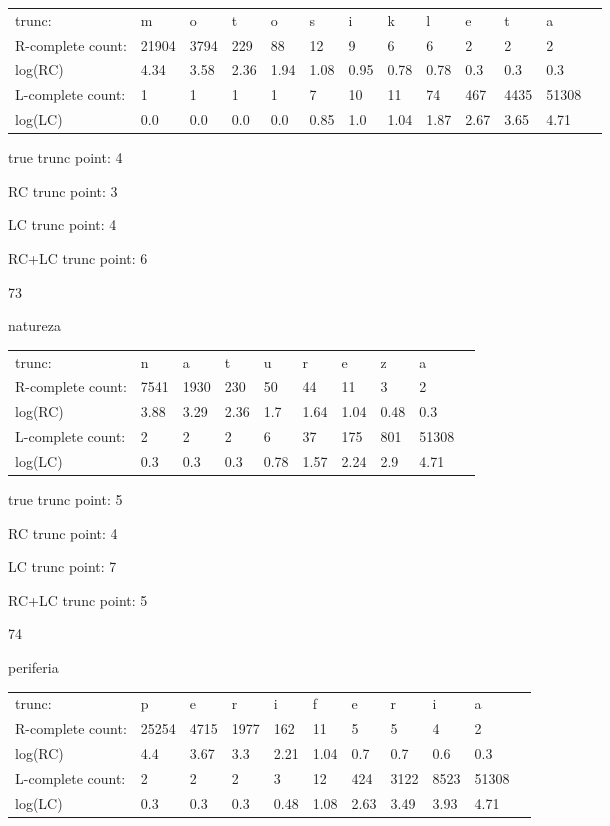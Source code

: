\documentclass{article}
\begin{document}
\begin{tabular}{l|llllllllllll}
trunc: & m & o & t & o & s & i & k & l & e & t & a & \\ 
R-complete count: & 21904 & 3794 & 229 & 88 & 12 & 9 & 6 & 6 & 2 & 2 & 2 & \\ 
log(RC) & 4.34 & 3.58 & 2.36 & 1.94 & 1.08 & 0.95 & 0.78 & 0.78 & 0.3 & 0.3 & 0.3 & \\ 
L-complete count: & 1 & 1 & 1 & 1 & 7 & 10 & 11 & 74 & 467 & 4435 & 51308 & \\ 
log(LC) & 0.0 & 0.0 & 0.0 & 0.0 & 0.85 & 1.0 & 1.04 & 1.87 & 2.67 & 3.65 & 4.71 & \\ 
\end{tabular}

true trunc point: 4

RC trunc point: 3

LC trunc point: 4

RC+LC trunc point: 6

\newpage

73

natureza

\begin{tabular}{l|lllllllll}
trunc: & n & a & t & u & r & e & z & a & \\ 
R-complete count: & 7541 & 1930 & 230 & 50 & 44 & 11 & 3 & 2 & \\ 
log(RC) & 3.88 & 3.29 & 2.36 & 1.7 & 1.64 & 1.04 & 0.48 & 0.3 & \\ 
L-complete count: & 2 & 2 & 2 & 6 & 37 & 175 & 801 & 51308 & \\ 
log(LC) & 0.3 & 0.3 & 0.3 & 0.78 & 1.57 & 2.24 & 2.9 & 4.71 & \\ 
\end{tabular}

true trunc point: 5

RC trunc point: 4

LC trunc point: 7

RC+LC trunc point: 5

\vspace{1em}

74

periferia

\begin{tabular}{l|llllllllll}
trunc: & p & e & r & i & f & e & r & i & a & \\ 
R-complete count: & 25254 & 4715 & 1977 & 162 & 11 & 5 & 5 & 4 & 2 & \\ 
log(RC) & 4.4 & 3.67 & 3.3 & 2.21 & 1.04 & 0.7 & 0.7 & 0.6 & 0.3 & \\ 
L-complete count: & 2 & 2 & 2 & 3 & 12 & 424 & 3122 & 8523 & 51308 & \\ 
log(LC) & 0.3 & 0.3 & 0.3 & 0.48 & 1.08 & 2.63 & 3.49 & 3.93 & 4.71 & \\ 
\end{tabular}
\end{document}
